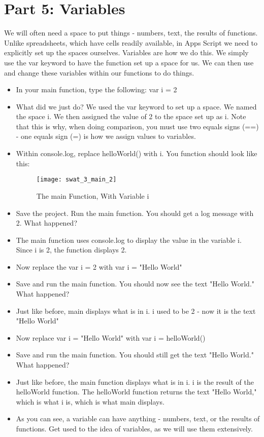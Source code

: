 \documentclass{article}
\begin{document}
\section*{Part 5: Variables}
We will often need a space to put things - numbers, text, the results of functions.  Unlike spreadsheets, which have cells readily available, in Apps Script we need to explicitly set up the spaces ourselves.  Variables are how we do this.  We simply use the var keyword to have the function set up a space for us. We can then use and change these variables within our functions to do things. 
\begin{itemize}
	\item In your main function, type the following:  var i = 2
	\item What did we just do?  We used the var keyword to set up a space.  We named the space i.  We then assigned the value of 2 to the space set up as i.  Note that this is why, when doing comparison, you must use two equals signs (==) - one equals sign (=) is how we assign values to variables.
	\item Within console.log, replace helloWorld() with i.  You function should look like this:
	\begin{figure}[H]
  		\centering
  		\texttt{[image: swat\_3\_main\_2]}
  		\caption{The main Function, With Variable i}
	\end{figure}
	\item Save the project.  Run the main function.  You should get a log message with 2.  What happened?
	\item The main function uses console.log to display the value in the variable i.  Since i is 2, the function displays 2.
	\item Now replace the var i = 2 with var i = "Hello World"
	\item Save and run the main function.  You should now see the text "Hello World."  What happened?
	\item Just like before, main displays what is in i.  i used to be 2 - now it is the text "Hello World"
	\item Now replace var i = "Hello World" with var i = helloWorld()
	\item Save and run the main function.  You should still get the text "Hello World."  What happened?
	\item Just like before, the main function displays what is in i.  i is the result of the helloWorld function.  The helloWorld function returns the text "Hello World," which is what i is, which is what main displays.
	\item As you can see, a variable can have anything - numbers, text, or the results of functions.  Get used to the idea of variables, as we will use them extensively.
\end{itemize}
\end{document}

